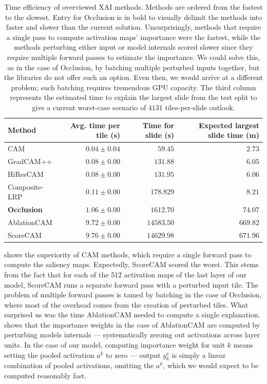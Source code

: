 \begin{table}
\centering
{}
\begin{tabular}{@{} l r r r @{}}\toprule
Method & Avg. time per tile (s) & Time for slide (s) & Expected largest slide time (m) \\ 
\midrule
CAM           & $0.04 \pm 0.04$ & $59.45$    & $2.73$ \\
GradCAM++     & $0.08 \pm 0.00$ & $131.88$   & $6.05$ \\
HiResCAM      & $0.08 \pm 0.00$ & $131.95$   & $6.06$ \\
Composite-LRP & $0.11 \pm 0.00$ & $178.829$  & $8.21$ \\
\textbf{Occlusion}     & $1.06 \pm 0.00$ & $1612.70$  & $74.07$ \\
AblationCAM   & $9.72 \pm 0.00$ & $14583.50$ & $669.82$ \\
ScoreCAM      & $9.76 \pm 0.00$ & $14629.98$ & $671.96$ \\
\bottomrule
\end{tabular}
\caption{
Time efficiency of overviewed XAI methods.
Methods are ordered from the fastest to the slowest.
Entry for Occlusion is in bold to visually delimit the methods into faster and slower than the current solution.
Unsurprisingly, methods that require a single pass to compute activation maps' importance were the fastest, while the methods perturbing either input or model internals scored slower since they require multiple forward passes to estimate the importance.
We could solve this, as in the case of Occlusion, by batching multiple perturbed inputs together, but the libraries do not offer such an option.
Even then, we would arrive at a different problem; such batching requires tremendous GPU capacity.
The third column represents the estimated time to explain the largest slide from the test split to give a current worst-case scenario of $4131$ tiles-per-slide outlook.
}
\label{tab:comp-time}
\end{table}

 shows the superiority of CAM methods, which require a single forward pass to compute the saliency maps.
Expectedly, ScoreCAM scored the worst.
This stems from the fact that for each of the $512$ activation maps of the last layer of our model, ScoreCAM runs a separate forward pass with a perturbed input tile.
The problem of multiple forward passes is tamed by batching in the case of Occlusion, where most of the overhead comes from the creation of perturbed tiles.
What surprised us was the time AblationCAM needed to compute a single explanation.
 shows that the importance weights in the case of AblationCAM are computed by perturbing models internals --- systematically zeroing out activations across layer units.
In the case of our model, computing importance weight for unit $k$ means setting the pooled activation $a^k$ to zero --- output $y^c_k$ is simply a linear combination of pooled activations, omitting the $a^k$, which we would expect to be computed reasonably fast.

